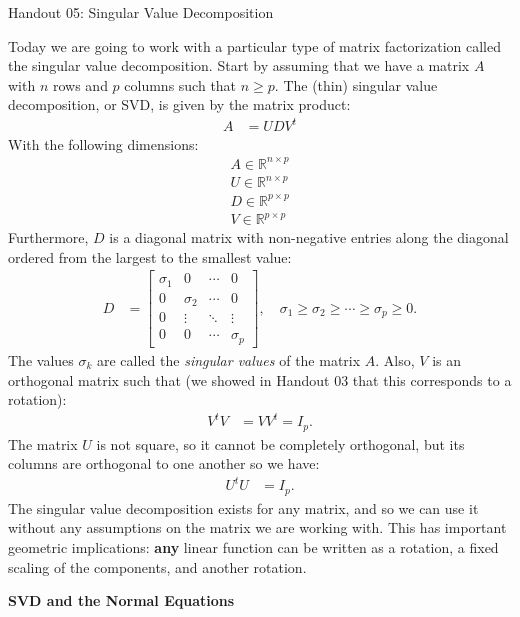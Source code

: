 \documentclass[12pt,hidelinks]{article}
\numberwithin{equation}{section}
\begin{document}
{\LARGE Handout 05: Singular Value Decomposition}

\vspace*{18pt}

Today we are going to work with a particular type of matrix factorization
called the singular value decomposition. Start by assuming that we have a
matrix $A$ with $n$ rows and $p$ columns such that $n \geq p$. The (thin)
singular value decomposition, or SVD, is given by the matrix product:
\begin{align}
A &= U D V^t
\end{align}
With the following dimensions:
\begin{align}
A \in \mathbb{R}^{n \times p} \\
U \in \mathbb{R}^{n \times p} \\
D \in \mathbb{R}^{p \times p} \\
V \in \mathbb{R}^{p \times p}
\end{align}
Furthermore, $D$ is a diagonal matrix with non-negative entries along the
diagonal ordered from the largest to the smallest value:
\begin{align}
D &= \begin{bmatrix}
\sigma_1 & 0 & \cdots & 0\\
0 & \sigma_2 & \cdots & 0 \\
0 & \vdots & \ddots & \vdots \\
0 & 0 & \cdots & \sigma_p \end{bmatrix}, \quad \sigma_1 \geq \sigma_2 \geq \cdots \geq \sigma_p \geq 0.
\end{align}
The values $\sigma_k$ are called the \textit{singular values} of the matrix $A$.
Also, $V$ is an orthogonal matrix such that (we showed in Handout 03 that this
corresponds to a rotation):
\begin{align}
V^t V &= V V^t = I_p.
\end{align}
The matrix $U$ is not square, so it cannot be completely orthogonal, but its
columns are orthogonal to one another so we have:
\begin{align}
U^t U &= I_p.
\end{align}
The singular value decomposition exists for any matrix, and so we can use it
without any assumptions on the matrix we are working with. This has important
geometric implications: \textbf{any} linear function can be written as a
rotation, a fixed scaling of the components, and another rotation.

\textbf{SVD and the Normal Equations}
\end{document}
